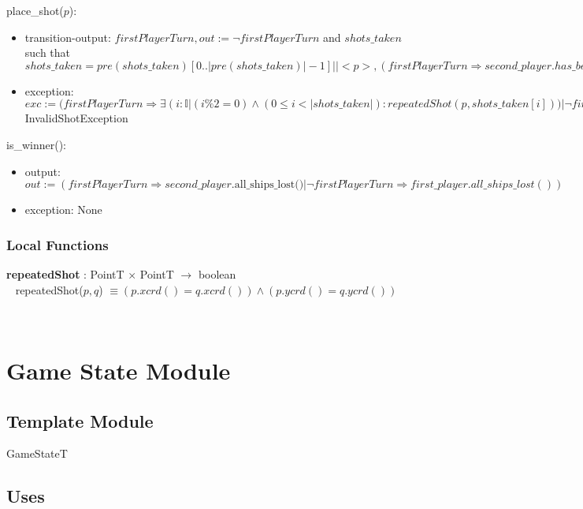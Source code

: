 \documentclass[12pt]{article}
\begin{document}
\noindent place\_shot($p$):
\begin{itemize}
\item transition-output: $firstPlayerTurn, out := \lnot firstPlayerTurn$ and $shots\_taken$ such that $shots\_taken = pre(shots\_taken)[0..|pre(shots\_taken)|-1]||\mathit{<}p\mathit{>}, (firstPlayerTurn \Rightarrow second\_player.has\_been\_shot(p) | \lnot firstPlayerTurn \Rightarrow first\_player.has\_been\_shot(p))$
\item exception: $exc := (firstPlayerTurn \Rightarrow \exists( i : \mathbb{I} | (i \% 2 = 0) \land (0 \leq i < |shots\_taken|) : repeatedShot(p, shots\_taken[i]))| \lnot firstPlayerTurn \Rightarrow \exists( i : \mathbb{I} | (i \% 2 = 1) \land (1 \leq i < |shots\_taken|) : repeatedShot(p, shots\_taken[i]))) \Rightarrow$ InvalidShotException
\end{itemize}

\noindent is\_winner():
\begin{itemize}
\item output: $out := (firstPlayerTurn \Rightarrow second\_player.\mbox{all\_ships\_lost()}| \lnot firstPlayerTurn \Rightarrow first\_player.all\_ships\_lost())$
\item exception: None
\end{itemize}

\subsubsection* {Local Functions}
\textbf{repeatedShot} : PointT $\times$ PointT $\rightarrow$ boolean\\
~\newline
repeatedShot($p,q$) $\equiv (p.xcrd() = q.xcrd()) \land (p.ycrd() = q.ycrd())$

~\newline

\section* {Game State Module}

\subsection* {Template Module}

GameStateT

\subsection* {Uses}
\end{document}
